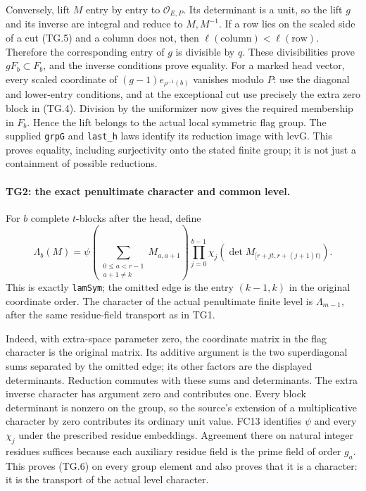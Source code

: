Conversely, lift $M$ entry by entry to $\mathcal O_{E,P}$.
Its determinant is a unit, so the lift $g$ and its inverse are
integral and reduce to $M,M^{-1}$. If a row lies on the scaled
side of a cut (TG.5) and a column does not, then
$\ell(\text{column})<\ell(\text{row})$. Therefore the corresponding
entry of $g$ is divisible by $q$. These divisibilities prove
$gF_b\subset F_b$, and the inverse conditions prove equality.
For a marked head vector, every scaled coordinate of
$(g-1)e_{\rho^{-1}(b)}$ vanishes modulo $P$: use the diagonal and
lower-entry conditions, and at the exceptional cut use precisely
the extra zero block in (TG.4). Division by the uniformizer now
gives the required membership in $F_b$. Hence the lift belongs
to the actual local symmetric flag group. The supplied
\texttt{grpG} and \texttt{last\_h} laws identify its reduction
image with $\mathrm{levG}$. This proves equality, including
surjectivity onto the stated finite group; it is not just a
containment of possible reductions.

\paragraph{TG2: the exact penultimate character and common level.}
For $b$ complete $t$-blocks after the head, define
\[
 \Lambda_b(M)=
 \psi\!\left(\sum_{\substack{0\le a<r-1\\a+1\ne k}}
                     M_{a,a+1}\right)
 \prod_{j=0}^{b-1}\chi_j\!\left(
       \det M_{[r+jt,r+(j+1)t)}\right).
 \tag{TG.6}
\]
This is exactly \texttt{lamSym}; the omitted edge is the entry
$(k-1,k)$ in the original coordinate order. The character of the
actual penultimate finite level is $\Lambda_{m-1}$, after the
same residue-field transport as in TG1.

Indeed, with extra-space parameter zero, the coordinate matrix
in the flag character is the original matrix. Its additive
argument is the two superdiagonal sums separated by the omitted
edge; its other factors are the displayed determinants. Reduction
commutes with these sums and determinants. The extra inverse
character has argument zero and contributes one. Every block
determinant is nonzero on the group, so the source's extension
of a multiplicative character by zero contributes its ordinary
unit value. FC13 identifies $\psi$ and every $\chi_j$ under the
prescribed residue embeddings. Agreement there on natural
integer residues suffices because each auxiliary residue field
is the prime field of order $g_a$. This proves (TG.6) on every
group element and also proves that it is a character: it is the
transport of the actual level character.


